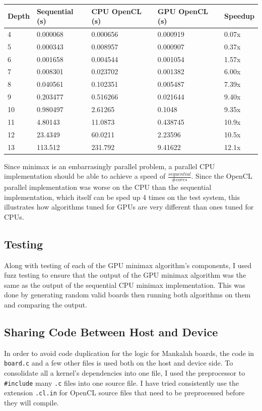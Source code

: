 \documentclass{article}
\begin{document}
\begin{tabular}{| l | l | l | l | l |}
  \hline
  Depth & Sequential (s) & CPU OpenCL (s) & GPU OpenCL (s) & Speedup\\
  \hline
  4 & 0.000068 & 0.000656 & 0.000919 & 0.07x \\
  5 & 0.000343 & 0.008957 & 0.000907 & 0.37x \\
  6 & 0.001658 & 0.004544 & 0.001054 & 1.57x \\
  7 & 0.008301 & 0.023702 & 0.001382 & 6.00x \\
  8 & 0.040561 & 0.102351 & 0.005487 & 7.39x \\
  9 & 0.203477 & 0.516266 & 0.021644 & 9.40x \\
  10 & 0.980497 & 2.61265 & 0.1048 & 9.35x \\
  11 & 4.80143 & 11.0873 & 0.438745 & 10.9x \\
  12 & 23.4349 & 60.0211 & 2.23596 & 10.5x \\
  13 & 113.512 & 231.792 & 9.41622 & 12.1x \\
  \hline
\end{tabular}
Since minimax is an embarrasingly parallel problem, a parallel CPU implementation should be able to achieve a speed of $\frac{sequential}{\# cores}$. Since the OpenCL parallel implementation was worse on the CPU than the sequential implementation, which itself can be sped up 4 times on the test system, this illustrates how algorithms tuned for GPUs are very different than ones tuned for CPUs.

\subsection{Testing}
Along with testing of each of the GPU minimax algorithm's components, I used fuzz testing to ensure that the output of the GPU minimax algorithm was the same as the output of the sequential CPU minimax implementation. This was done by generating random valid boards then running both algorithms on them and comparing the output.

\subsection{Sharing Code Between Host and Device}
In order to avoid code duplication for the logic for Mankalah boards, the code in \texttt{board.c} and a few other files is used both on the host and device side. To consolidate all a kernel's dependencies into one file, I used the preprocessor to \texttt{\#include} many \texttt{.c} files into one source file. I have tried consistently use the extension \texttt{.cl.in} for OpenCL source files that need to be preprocessed before they will compile.
\end{document}
